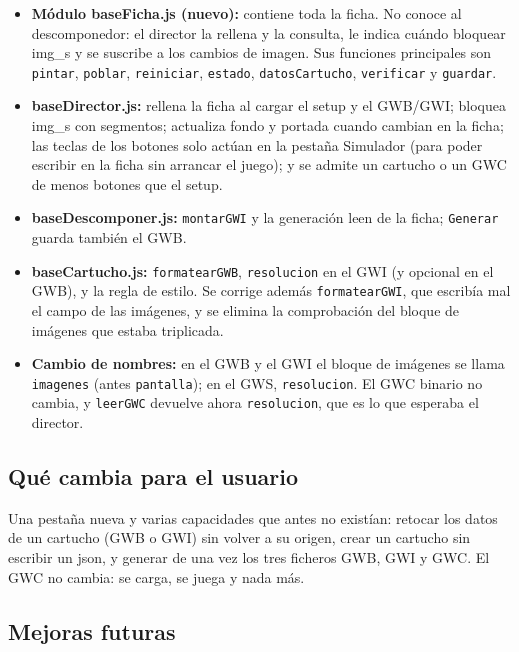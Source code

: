 \begin{itemize}
	\item \textbf{Módulo baseFicha.js (nuevo):} contiene toda la ficha. No conoce al descomponedor: el director la rellena y la consulta, le indica cuándo bloquear img\_s y se suscribe a los cambios de imagen. Sus funciones principales son \texttt{pintar}, \texttt{poblar}, \texttt{reiniciar}, \texttt{estado}, \texttt{datosCartucho}, \texttt{verificar} y \texttt{guardar}.
	\item \textbf{baseDirector.js:} rellena la ficha al cargar el setup y el GWB/GWI; bloquea img\_s con segmentos; actualiza fondo y portada cuando cambian en la ficha; las teclas de los botones solo actúan en la pestaña Simulador (para poder escribir en la ficha sin arrancar el juego); y se admite un cartucho o un GWC de menos botones que el setup.
	\item \textbf{baseDescomponer.js:} \texttt{montarGWI} y la generación leen de la ficha; \texttt{Generar} guarda también el GWB.
	\item \textbf{baseCartucho.js:} \texttt{formatearGWB}, \texttt{resolucion} en el GWI (y opcional en el GWB), y la regla de estilo. Se corrige además \texttt{formatearGWI}, que escribía mal el campo de las imágenes, y se elimina la comprobación del bloque de imágenes que estaba triplicada.
	\item \textbf{Cambio de nombres:} en el GWB y el GWI el bloque de imágenes se llama \texttt{imagenes} (antes \texttt{pantalla}); en el GWS, \texttt{resolucion}. El GWC binario no cambia, y \texttt{leerGWC} devuelve ahora \texttt{resolucion}, que es lo que esperaba el director.
\end{itemize}

\subsection{Qué cambia para el usuario}
\label{sec:F5I10Usuario}

Una pestaña nueva y varias capacidades que antes no existían: retocar
los datos de un cartucho (GWB o GWI) sin volver a su origen, crear
un cartucho sin escribir un json, y generar de una vez los tres ficheros 
GWB, GWI y GWC. El GWC no cambia: se carga, se juega y nada más.

\subsection{Mejoras futuras}
\label{sec:F5I10Mejoras}

